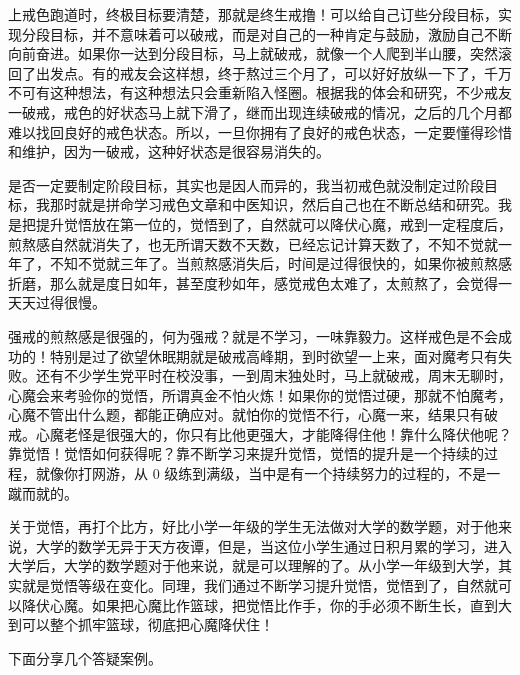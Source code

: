 \documentclass{ctexart}
\begin{document}
上戒色跑道时，终极目标要清楚，那就是终生戒撸！可以给自己订些分段目标，实现分段目标，并不意味着可以破戒，而是对自己的一种肯定与鼓励，激励自己不断向前奋进。如果你一达到分段目标，马上就破戒，就像一个人爬到半山腰，突然滚回了出发点。有的戒友会这样想，终于熬过三个月了，可以好好放纵一下了，千万不可有这种想法，有这种想法只会重新陷入怪圈。根据我的体会和研究，不少戒友一破戒，戒色的好状态马上就下滑了，继而出现连续破戒的情况，之后的几个月都难以找回良好的戒色状态。所以，一旦你拥有了良好的戒色状态，一定要懂得珍惜和维护，因为一破戒，这种好状态是很容易消失的。

是否一定要制定阶段目标，其实也是因人而异的，我当初戒色就没制定过阶段目标，我那时就是拼命学习戒色文章和中医知识，然后自己也在不断总结和研究。我是把提升觉悟放在第一位的，觉悟到了，自然就可以降伏心魔，戒到一定程度后，煎熬感自然就消失了，也无所谓天数不天数，已经忘记计算天数了，不知不觉就一年了，不知不觉就三年了。当煎熬感消失后，时间是过得很快的，如果你被煎熬感折磨，那么就是度日如年，甚至度秒如年，感觉戒色太难了，太煎熬了，会觉得一天天过得很慢。

强戒的煎熬感是很强的，何为强戒？就是不学习，一味靠毅力。这样戒色是不会成功的！特别是过了欲望休眠期就是破戒高峰期，到时欲望一上来，面对魔考只有失败。还有不少学生党平时在校没事，一到周末独处时，马上就破戒，周末无聊时，心魔会来考验你的觉悟，所谓真金不怕火炼！如果你的觉悟过硬，那就不怕魔考，心魔不管出什么题，都能正确应对。就怕你的觉悟不行，心魔一来，结果只有破戒。心魔老怪是很强大的，你只有比他更强大，才能降得住他！靠什么降伏他呢？靠觉悟！觉悟如何获得呢？靠不断学习来提升觉悟，觉悟的提升是一个持续的过程，就像你打网游，从 0 级练到满级，当中是有一个持续努力的过程的，不是一蹴而就的。

关于觉悟，再打个比方，好比小学一年级的学生无法做对大学的数学题，对于他来说，大学的数学无异于天方夜谭，但是，当这位小学生通过日积月累的学习，进入大学后，大学的数学题对于他来说，就是可以理解的了。从小学一年级到大学，其实就是觉悟等级在变化。同理，我们通过不断学习提升觉悟，觉悟到了，自然就可以降伏心魔。如果把心魔比作篮球，把觉悟比作手，你的手必须不断生长，直到大到可以整个抓牢篮球，彻底把心魔降伏住！

下面分享几个答疑案例。
\end{document}
